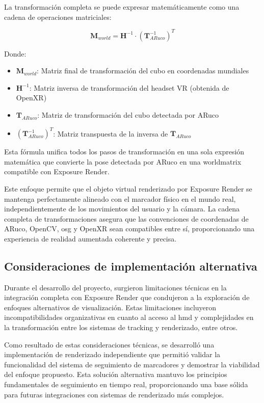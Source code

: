 La transformación completa se puede expresar matemáticamente como una cadena de operaciones matriciales:

$$\mathbf{M}_{world} = \mathbf{H}^{-1} \cdot (\mathbf{T}_{ARuco}^{-1})^T$$

Donde:
\begin{itemize}
    \item $\mathbf{M}_{world}$: Matriz final de transformación del cubo en coordenadas mundiales
    \item $\mathbf{H}^{-1}$: Matriz inversa de transformación del headset VR (obtenida de OpenXR)
    \item $\mathbf{T}_{ARuco}$: Matriz de transformación del cubo detectada por ARuco
    \item $(\mathbf{T}_{ARuco}^{-1})^T$: Matriz transpuesta de la inversa de $\mathbf{T}_{ARuco}$
\end{itemize}

Esta fórmula unifica todos los pasos de transformación en una sola expresión matemática que convierte la \gls{pose} detectada por ARuco en una \gls{worldmatrix} compatible con Exposure Render.

Este enfoque permite que el objeto virtual renderizado por Exposure Render se mantenga perfectamente alineado con el marcador físico en el mundo real, independientemente de los movimientos del usuario y la cámara. La cadena completa de transformaciones asegura que las convenciones de coordenadas de ARuco, OpenCV, \acrshort{osg} y OpenXR sean compatibles entre sí, proporcionando una experiencia de realidad aumentada coherente y precisa.

\subsection{Consideraciones de implementación alternativa}

Durante el desarrollo del proyecto, surgieron limitaciones técnicas en la integración completa con Exposure Render que condujeron a la exploración de enfoques alternativos de visualización. Estas limitaciones incluyeron incompatibilidades organizativas en cuanto al acceso al \acrshort{hmd} y complejidades en la transformación entre los sistemas de \gls{tracking} y renderizado, entre otros.

Como resultado de estas consideraciones técnicas, se desarrolló una implementación de renderizado independiente que permitió validar la funcionalidad del sistema de seguimiento de marcadores y demostrar la viabilidad del enfoque propuesto. Esta solución alternativa mantuvo los principios fundamentales de seguimiento en tiempo real, proporcionando una base sólida para futuras integraciones con sistemas de renderizado más complejos.

